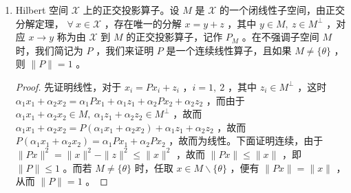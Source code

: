\begin{enumerate}[leftmargin=2cm, label=\arabic*]
\begin{proof}
		\end{proof}
		\item Hilbert 空间 $\mathscr{X}$ 上的正交投影算子。设 $M$ 是 $\mathscr{X}$ 的一个闭线性子空间，由正交分解定理， $\forall\ x\in\mathscr{X}$ ，存在唯一的分解 $x = y + z$ ，其中 $y\in M,\ z\in M^{\perp}$ ，对应 $x\to y$ 称为由 $\mathscr{X}$ 到 $M$ 的正交投影算子，记作 $P_M$ 。在不强调子空间 $M$ 时，我们简记为 $P$ ，我们来证明 $P$ 是一个连续线性算子，且如果 $M\neq \{\theta\}$ ，则 $\|P\| = 1$ 。
		\begin{proof}
			先证明线性，对于 $x_i = Px_i + z_i$ ，$i = 1,\ 2$ ，其中 $z_i \in M^{\perp}$ ，这时 $\alpha_1 x_1 + \alpha_2 x_2 = \alpha_1 Px_1 + \alpha_1 z_1 + \alpha_2 Px_2 + \alpha_2 z_2$ ，而由于 $\alpha_1x_1 + \alpha_2x_2\in M,\ \alpha_1z_1 + \alpha_2z_2\in M^{\perp}$ ，故而 $\alpha_1 x_1 + \alpha_2 x_2 = P(\alpha_1 x_1 + \alpha_2 x_2) + \alpha_1z_1 + \alpha_2z_2$ ，故而 $P(\alpha_1x_1 + \alpha_2x_2) = \alpha_1 P x_1 + \alpha_2 P x_2$ ，故而为线性。下面证明连续，由于 $\|Px\|^2 = \|x\|^2 - \|z\|^2 \leqslant \|x\|^2$ ，故而 $\|Px\| \leqslant \|x\|$ ，即 $\|P\| \leqslant 1$ 。而若 $M \neq \{\theta\}$ 时，任取 $x\in M\backslash\{\theta\}$ ，便有 $\|Px\| = \|x\|$ ，从而 $\|P\| = 1$ 。
		\end{proof}
	\end{enumerate}
	
